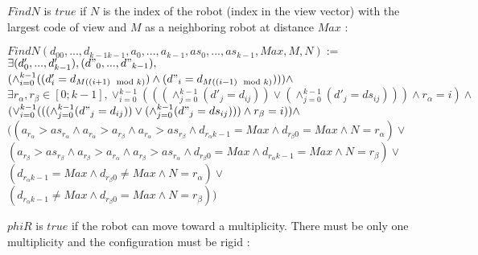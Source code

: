 \documentclass{article}
\begin{document}
$FindN$ is $true$ if $N$ is the index of the robot (index in the view vector) with the largest code of view and $M$ as a neighboring robot at distance $Max$ :

\begin{center}

$FindN(d_{00}, ...,d_{k-1k-1}, a_{0}, ..., a_{k-1}, as_{0}, ..., as_{k-1}, Max, M, N):=$\\
$\exists (d'_{0}, ..., d'_{k-1}), (d"_{0}, ..., d"_{k-1}),$\\
$(\land_{i=0}^{k-1} ((d'_{i} = d_{M((i+1)\mod{k})}) \land (d"_{i} = d_{M((i-1)\mod{k})}))) \land$\\
$\exists r_{\alpha}, r_{\beta} \in [0; k-1], \lor_{i=0}^{k-1}(((\land_{j=0}^{k-1}(d'_{j} = d_{ij})) \lor
(\land_{j=0}^{k-1}(d'_{j} = ds_{ij}) ))
\land r_{\alpha} = i )\land$\\
$(\lor_{i=0}^{k-1}(((\land_{j=0}^{k-1}(d"_{j} = d_{ij})) \lor
(\land_{j=0}^{k-1}(d"_{j} = ds_{ij}) ))
\land r_{\beta} = i )) \land$\\
$((a_{r_\alpha} > as_{r_\alpha} \land a_{r_\alpha} > a_{r_\beta} \land a_{r_\alpha} > as_{r_\beta}
\land d_{r_{\alpha}k-1} = Max \land d_{r_{\beta}0} = Max
\land N = r_{\alpha}) \lor$\\
$(a_{r_\beta} > as_{r_\beta} \land a_{r_\beta} > a_{r_\alpha} \land a_{r_\beta} > as_{r_\alpha} 
\land d_{r_{\beta}0} = Max \land d_{r_{\alpha}k-1} = Max
\land N = r_{\beta}) \lor$\\
$(d_{r_{\alpha}k-1} = Max \land d_{r_{\beta}0} \not= Max \land N = r_{\alpha}) \lor$\\
$(d_{r_{\alpha}k-1} \not= Max \land d_{r_{\beta}0} = Max \land N = r_{\beta}))$
\end{center}

$phiR$ is $true$ if the robot can move toward a multiplicity. There must be only one multiplicity and the configuration must be rigid :
\end{document}
